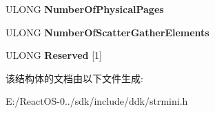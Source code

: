 \begin{DoxyCompactItemize}
\begin{tabbing}
\end{tabbing}\item 
\mbox{\label{struct___h_w___s_t_r_e_a_m___r_e_q_u_e_s_t___b_l_o_c_k_ad051c432557ca26577b8dbcc05014120}} 
U\+L\+O\+NG {\bfseries Number\+Of\+Physical\+Pages}
\item 
\mbox{\label{struct___h_w___s_t_r_e_a_m___r_e_q_u_e_s_t___b_l_o_c_k_af4a980df9fb16cc30586b249ce6c3ffa}} 
U\+L\+O\+NG {\bfseries Number\+Of\+Scatter\+Gather\+Elements}
\item 
\mbox{\label{struct___h_w___s_t_r_e_a_m___r_e_q_u_e_s_t___b_l_o_c_k_a8bee31b75c006a4b2b671706e489fcf4}} 
U\+L\+O\+NG {\bfseries Reserved} \mbox{[}1\mbox{]}
\end{DoxyCompactItemize}


该结构体的文档由以下文件生成\+:\begin{DoxyCompactItemize}
\item 
E\+:/\+React\+O\+S-\/0../sdk/include/ddk/strmini.\+h\end{DoxyCompactItemize}
